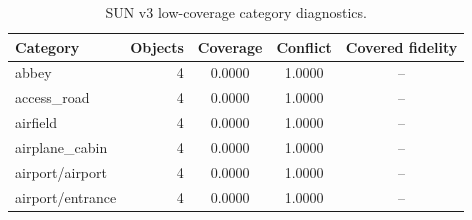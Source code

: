 \begin{table}[H]
\caption{SUN v3 low-coverage category diagnostics.\label{tab:sun_v3_category_diagnostics}}
\centering
\small
\begin{tabular}{lrccc}
\toprule
Category & Objects & Coverage & Conflict & Covered fidelity \\
\midrule
abbey & 4 & 0.0000 & 1.0000 & -- \\
access\_road & 4 & 0.0000 & 1.0000 & -- \\
airfield & 4 & 0.0000 & 1.0000 & -- \\
airplane\_cabin & 4 & 0.0000 & 1.0000 & -- \\
airport/airport & 4 & 0.0000 & 1.0000 & -- \\
airport/entrance & 4 & 0.0000 & 1.0000 & -- \\
\bottomrule
\end{tabular}
\end{table}

